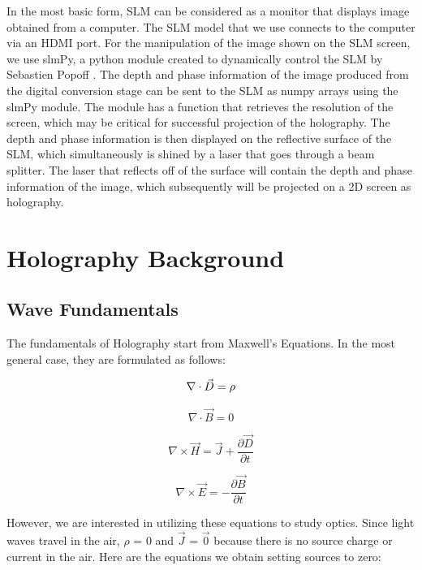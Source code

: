 \documentclass[12pt]{article}
\begin{document}
In the most basic form, SLM can be considered as a monitor that displays image obtained from a computer. The SLM model that we use connects to the computer via an HDMI port. For the manipulation of the image shown on the SLM screen, we use slmPy, a python module created to dynamically control the SLM by Sebastien Popoff \cite{slmPy}. The depth and phase information of the image produced from the digital conversion stage can be sent to the SLM as numpy arrays using the slmPy module. The module has a function that retrieves the resolution of the screen, which may be critical for successful projection of the holography. The depth and phase information is then displayed on the reflective surface of the SLM, which simultaneously is shined by a laser that goes through a beam splitter. The laser that reflects off of the surface will contain the depth and phase information of the image, which subsequently will be projected on a 2D screen as holography.


\section{Holography Background}

\subsection{Wave Fundamentals}

The fundamentals of Holography start from Maxwell's Equations. In the most general case, they are formulated as follows:

\begin{equation}
	\nabla \cdot \vec{D} = \rho\\
\end{equation}

\begin{equation}
	\nabla \cdot \vec{B} = 0
\end{equation}

\begin{equation}
	\nabla \times \vec{H} = \vec{J} + \frac{\partial \vec{D}}{\partial t}
\end{equation}

\begin{equation}
	\nabla \times \vec{E} = -\frac{\partial \vec{B}}{\partial t}
\end{equation}

However, we are interested in utilizing these equations to study optics. Since light waves travel in the air, \(\rho\) = 0 and \(\vec{J}\) = \(\vec{0}\) because there is no source charge or current in the air. Here are the equations we obtain setting sources to zero:
\end{document}
